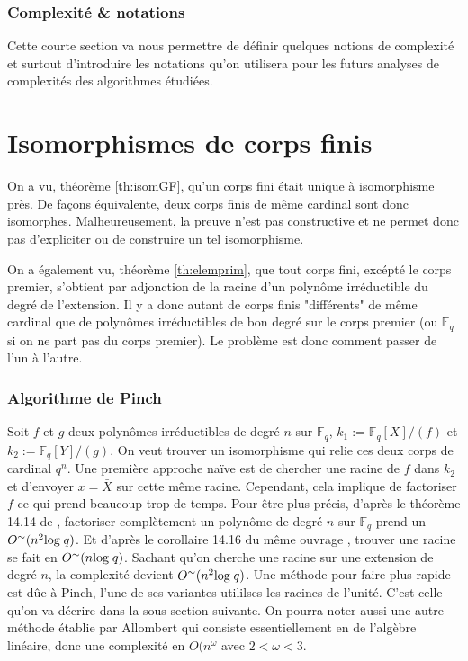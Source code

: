 \documentclass[a4paper]{article} %
\numberwithin{section}{part}
\numberwithin{equation}{section}
\newcommand\GF[1]{\mathbb{F}_{#1}}
\begin{document}
\section{Complexité \& notations}
Cette courte section va nous permettre de définir quelques notions de complexité
et surtout d'introduire les notations qu'on utilisera pour les futurs analyses
de complexités des algorithmes étudiées.

\part{Isomorphismes de corps finis}
\label{deux}
On a vu, théorème \ref{th:isomGF}, qu'un corps fini était unique à isomorphisme
près. De façons équivalente, deux corps finis de même cardinal sont donc 
isomorphes. Malheureusement, la preuve n'est pas constructive et ne permet donc 
pas d'expliciter ou de construire un tel isomorphisme.\par
On a également vu, théorème \ref{th:elemprim}, que tout corps fini, excépté le 
corps premier, s'obtient par adjonction de la racine d'un polynôme irréductible
du degré de l'extension. Il y a donc autant de corps finis "différents" de même
cardinal que de polynômes irréductibles de bon degré sur le corps premier (ou 
$\GF{q}$ si on ne part pas du corps premier). Le problème est donc comment 
passer de l'un à l'autre.\par

\section{Algorithme de Pinch}
Soit $f$ et $g$ deux polynômes irréductibles de degré $n$ sur $\GF{q}$, 
$k_1 := \GF{q}[X]/(f)$ et $k_2 := \GF{q}[Y]/(g)$. On veut trouver un 
isomorphisme qui relie ces deux corps de cardinal $q^n$. Une première approche 
naïve est de chercher une racine de $f$ dans $k_2$ et d'envoyer $x = \bar{X}$
sur cette même racine. Cependant, cela implique de factoriser $f$ ce qui prend
beaucoup trop de temps. Pour être plus précis, d'après le théorème 14.14 de
\cite[p.~390]{GaGe}, factoriser complètement un polynôme de degré $n$ sur 
$\GF{q}$ prend un $O^{\sim}(n^2\textup{log\;}q)$. Et d'après le corollaire 14.16
du même ouvrage \cite[p.~392]{GaGe}, trouver une racine se fait en
$O^{\sim}(n\textup{log\;}q)$. Sachant qu'on cherche une racine sur une 
extension de degré $n$, la complexité devient $O^{\sim}(n^2\textup{log\;}q)$.
Une méthode pour faire plus rapide est dûe à Pinch, l'une de ses variantes
utililses les racines de l'unité. C'est celle qu'on va décrire dans la
sous-section suivante. On pourra noter aussi une autre méthode établie par
Allombert \cite{All} qui consiste essentiellement en de l'algèbre linéaire, donc
une complexité en $O(n^{\omega}$ avec $2<\omega<3$.
\end{document}
